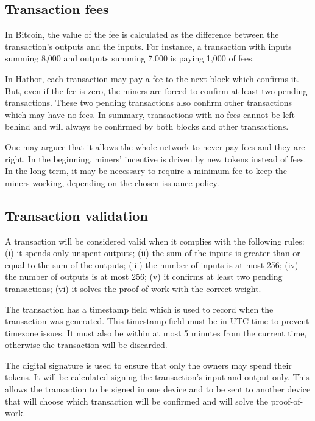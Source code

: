 \subsection{Transaction fees}

In Bitcoin, the value of the fee is calculated as the difference between the transaction's outputs and the inputs. For instance, a transaction with inputs summing 8,000 and outputs summing 7,000 is paying 1,000 of fees.

In Hathor, each transaction may pay a fee to the next block which confirms it. But, even if the fee is zero, the miners are forced to confirm at least two pending transactions. These two pending transactions also confirm other transactions which may have no fees. In summary, transactions with no fees cannot be left behind and will always be confirmed by both blocks and other transactions.

One may arguee that it allows the whole network to never pay fees and they are right. In the beginning, miners' incentive is driven by new tokens instead of fees. In the long term, it may be necessary to require a minimum fee to keep the miners working, depending on the chosen issuance policy.


\subsection{Transaction validation}

A transaction will be considered valid when it complies with the following rules: (i) it spends only unspent outputs; (ii) the sum of the inputs is greater than or equal to the sum of the outputs; (iii) the number of inputs is at most 256; (iv) the number of outputs is at most 256; (v) it confirms at least two pending transactions; (vi) it solves the proof-of-work with the correct weight.

The transaction has a timestamp field which is used to record when the transaction was generated. This timestamp field must be in UTC time to prevent timezone issues. It must also be within at most 5 minutes from the current time, otherwise the transaction will be discarded.

The digital signature is used to ensure that only the owners may spend their tokens. It will be calculated signing the transaction's input and output only. This allows the transaction to be signed in one device and to be sent to another device that will choose which transaction will be confirmed and will solve the proof-of-work.

